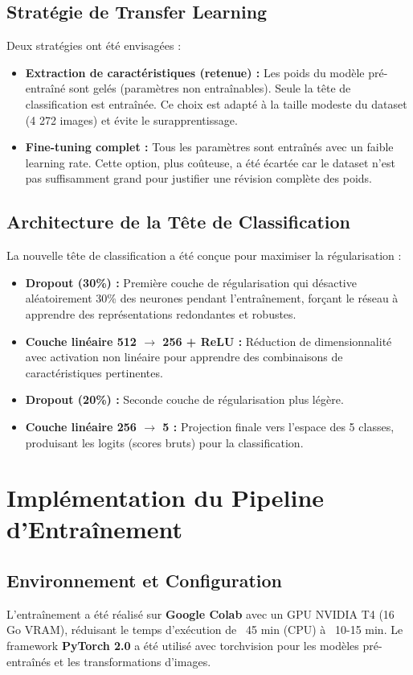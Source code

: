 \documentclass[12pt,a4paper]{report}
\begin{document}
\subsection{Stratégie de Transfer Learning}
Deux stratégies ont été envisagées :
\begin{itemize}
    \item \textbf{Extraction de caractéristiques (retenue) :} Les poids du modèle pré-entraîné sont gelés (paramètres non entraînables). Seule la tête de classification est entraînée. Ce choix est adapté à la taille modeste du dataset (4 272 images) et évite le surapprentissage.
    \item \textbf{Fine-tuning complet :} Tous les paramètres sont entraînés avec un faible learning rate. Cette option, plus coûteuse, a été écartée car le dataset n'est pas suffisamment grand pour justifier une révision complète des poids.
\end{itemize}

\subsection{Architecture de la Tête de Classification}
La nouvelle tête de classification a été conçue pour maximiser la régularisation :
\begin{itemize}
    \item \textbf{Dropout (30\%) :} Première couche de régularisation qui désactive aléatoirement 30\% des neurones pendant l'entraînement, forçant le réseau à apprendre des représentations redondantes et robustes.
    \item \textbf{Couche linéaire 512 $\rightarrow$ 256 + ReLU :} Réduction de dimensionnalité avec activation non linéaire pour apprendre des combinaisons de caractéristiques pertinentes.
    \item \textbf{Dropout (20\%) :} Seconde couche de régularisation plus légère.
    \item \textbf{Couche linéaire 256 $\rightarrow$ 5 :} Projection finale vers l'espace des 5 classes, produisant les logits (scores bruts) pour la classification.
\end{itemize}

\section{Implémentation du Pipeline d'Entraînement}

\subsection{Environnement et Configuration}
L'entraînement a été réalisé sur \textbf{Google Colab} avec un GPU NVIDIA T4 (16 Go VRAM), réduisant le temps d'exécution de ~45 min (CPU) à ~10-15 min. Le framework \textbf{PyTorch 2.0} a été utilisé avec torchvision pour les modèles pré-entraînés et les transformations d'images.
\end{document}
